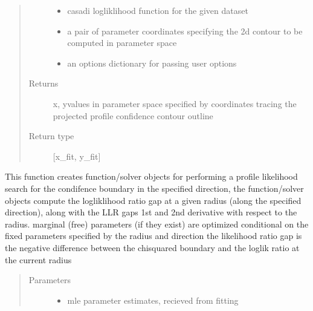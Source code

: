 \documentclass[letterpaper,10pt,english,openany,oneside]{sphinxmanual}
\begin{document}
\begin{fulllineitems}
\begin{fulllineitems}
\begin{quote}
\begin{description}
\begin{itemize}
\item {} 
 \textendash{} casadi logliklihood function for the given dataset

\item {} 
 \textendash{} a pair of parameter coordinates specifying the 2d contour to be computed in parameter space

\item {} 
 \textendash{} an options dictionary for passing user options

\end{itemize}

\item[{Returns}] \leavevmode
x, y\sphinxhyphen{}values in parameter space specified by coordinates tracing the projected profile confidence contour outline

\item[{Return type}] \leavevmode
{[}x\_fit, y\_fit{]}

\end{description}\end{quote}

\end{fulllineitems}


\begin{fulllineitems}
\label{\detokenize{nloed:nloed.model.Model.__profilesetup}}
This function creates function/solver objects for performing a profile likelihood search for the condifence boundary
in the specified direction,  the function/solver objects compute the logliklihood ratio gap
at a given radius (along the specified direction),  along with the LLR gaps 1st and 2nd derivative with respect to the radius.
marginal (free) parameters (if they exist) are optimized conditional on the fixed parameters specified by the radius and direction
the likelihood ratio gap is the negative difference between the chi\sphinxhyphen{}squared boundary and the loglik ratio at the current radius
\begin{quote}\begin{description}
\item[{Parameters}] \leavevmode\begin{itemize}
\item {} 
 \textendash{} mle parameter estimates,  recieved from fitting


\end{itemize}
\end{description}
\end{quote}
\end{fulllineitems}
\end{fulllineitems}
\end{document}
